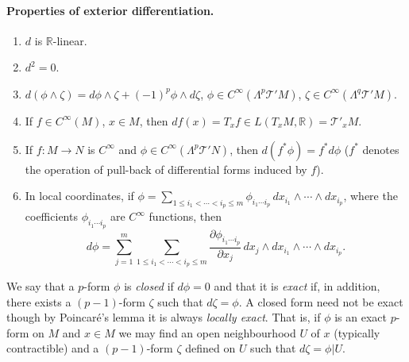 \paragraph{Properties of exterior differentiation.}
\begin{enumerate}
\item $d$ is $\mathbb R$-linear.
\item $d^2=0$.
\item $d(\phi\wedge\zeta)=d\phi\wedge\zeta+(-1)^p\phi\wedge d\zeta$, $\phi\in C^\infty(\Lambda^p\mathcal T'M)$, $\zeta\in C^\infty(\Lambda^q\mathcal T'M)$.
\item If $f\in C^\infty(M)$, $x\in M$, then $df(x)=T_x f\in L(T_x M,\mathbb R)=\mathcal T'_x M$.
\item If $f:M\to N$ is $C^\infty$ and $\phi\in C^\infty(\Lambda^p\mathcal T'N)$, then $d(f^*\phi)=f^*d\phi$ ($f^*$ denotes the operation of pull-back of differential forms induced by $f$).
\item In local coordinates, if $\phi=\sum_{1\leq i_1<\cdots<i_p\leq m}\phi_{i_1\cdots i_p}\,dx_{i_1}\wedge\cdots\wedge dx_{i_p}$, where the coefficients $\phi_{i_1\cdots i_p}$ are $C^\infty$ functions, then
\[
d\phi=\sum_{j=1}^m\sum_{1\leq i_1<\cdots<i_p\leq m}\frac{\partial\phi_{i_1\cdots i_p}}{\partial x_j}\,dx_j\wedge dx_{i_1}\wedge\cdots\wedge dx_{i_p}.
\]
\end{enumerate}
We say that a $p$-form $\phi$ is \emph{closed} if $d\phi=0$ and that it is \emph{exact} if, in addition, there exists a $(p-1)$-form $\zeta$ such that $d\zeta=\phi$. A closed form need not be exact though by Poincar\'e's lemma it is always \emph{locally exact}. That is, if $\phi$ is an exact $p$-form on $M$ and $x\in M$ we may find an open neighbourhood $U$ of $x$ (typically contractible) and a $(p-1)$-form $\zeta$ defined on $U$ such that $d\zeta=\phi|U$.

